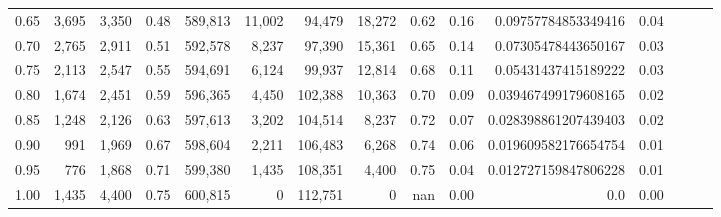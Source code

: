 \begin{tabular}{rrrrrrrrrrrrrrr}
0.65 &    3,695 &   3,350 &  0.48 &  589,813 &   11,002 &   94,479 &   18,272 &  0.62 &  0.16 &   0.09757784853349416 &      0.04 \\
0.70 &    2,765 &   2,911 &  0.51 &  592,578 &    8,237 &   97,390 &   15,361 &  0.65 &  0.14 &   0.07305478443650167 &      0.03 \\
0.75 &    2,113 &   2,547 &  0.55 &  594,691 &    6,124 &   99,937 &   12,814 &  0.68 &  0.11 &   0.05431437415189222 &      0.03 \\
0.80 &    1,674 &   2,451 &  0.59 &  596,365 &    4,450 &  102,388 &   10,363 &  0.70 &  0.09 &  0.039467499179608165 &      0.02 \\
0.85 &    1,248 &   2,126 &  0.63 &  597,613 &    3,202 &  104,514 &    8,237 &  0.72 &  0.07 &  0.028398861207439403 &      0.02 \\
0.90 &      991 &   1,969 &  0.67 &  598,604 &    2,211 &  106,483 &    6,268 &  0.74 &  0.06 &  0.019609582176654754 &      0.01 \\
0.95 &      776 &   1,868 &  0.71 &  599,380 &    1,435 &  108,351 &    4,400 &  0.75 &  0.04 &  0.012727159847806228 &      0.01 \\
1.00 &    1,435 &   4,400 &  0.75 &  600,815 &        0 &  112,751 &        0 &   nan &  0.00 &                   0.0 &      0.00 \\
\bottomrule
\end{tabular}
